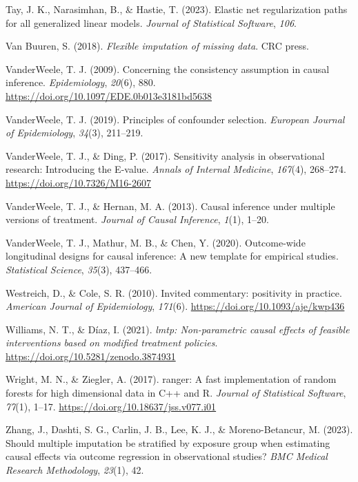 \documentclass[
  single column]{article}
\newlength{\cslhangindent}
\newenvironment{CSLReferences}[2] %
 {\begin{list}{}{%
  \setlength{\itemindent}{0pt}
  \setlength{\leftmargin}{0pt}
  \setlength{\parsep}{0pt}
  \ifodd #1
   \setlength{\leftmargin}{\cslhangindent}
   \setlength{\itemindent}{-1\cslhangindent}
  \fi
  \setlength{\itemsep}{#2\baselineskip}}}
 {\end{list}}
\begin{document}
\begin{CSLReferences}{1}{0}
Tay, J. K., Narasimhan, B., \& Hastie, T. (2023). Elastic net
regularization paths for all generalized linear models. \emph{Journal of
Statistical Software}, \emph{106}.

Van Buuren, S. (2018). \emph{Flexible imputation of missing data}. CRC
press.

VanderWeele, T. J. (2009). Concerning the consistency assumption in
causal inference. \emph{Epidemiology}, \emph{20}(6), 880.
\url{https://doi.org/10.1097/EDE.0b013e3181bd5638}

VanderWeele, T. J. (2019). Principles of confounder selection.
\emph{European Journal of Epidemiology}, \emph{34}(3), 211--219.

VanderWeele, T. J., \& Ding, P. (2017). Sensitivity analysis in
observational research: Introducing the {E}-value. \emph{Annals of
Internal Medicine}, \emph{167}(4), 268--274.
\url{https://doi.org/10.7326/M16-2607}

VanderWeele, T. J., \& Hernan, M. A. (2013). Causal inference under
multiple versions of treatment. \emph{Journal of Causal Inference},
\emph{1}(1), 1--20.

VanderWeele, T. J., Mathur, M. B., \& Chen, Y. (2020). Outcome-wide
longitudinal designs for causal inference: A new template for empirical
studies. \emph{Statistical Science}, \emph{35}(3), 437--466.

Westreich, D., \& Cole, S. R. (2010). Invited commentary: positivity in
practice. \emph{American Journal of Epidemiology}, \emph{171}(6).
\url{https://doi.org/10.1093/aje/kwp436}

Williams, N. T., \& Díaz, I. (2021). \emph{{l}mtp: Non-parametric causal
effects of feasible interventions based on modified treatment policies}.
\url{https://doi.org/10.5281/zenodo.3874931}

Wright, M. N., \& Ziegler, A. (2017). {ranger}: A fast implementation of
random forests for high dimensional data in {C++} and {R}. \emph{Journal
of Statistical Software}, \emph{77}(1), 1--17.
\url{https://doi.org/10.18637/jss.v077.i01}

Zhang, J., Dashti, S. G., Carlin, J. B., Lee, K. J., \& Moreno-Betancur,
M. (2023). Should multiple imputation be stratified by exposure group
when estimating causal effects via outcome regression in observational
studies? \emph{BMC Medical Research Methodology}, \emph{23}(1), 42.

\end{CSLReferences}
\end{document}
